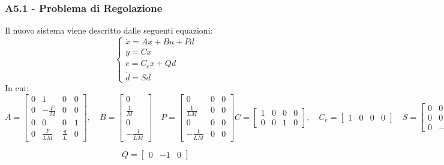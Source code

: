 \documentclass{beamer}
\begin{document}
\begin{frame}
	\frametitle{A5.1 - Problema di Regolazione}%
	Il nuovo sistema viene descritto dalle seguenti equazioni:
	\begin{equation*}
		\begin{cases}
			\dot{x}=Ax+Bu+Pd \\
			y=Cx             \\
			e=C_{e}x+Qd      \\
			\dot{d}=Sd
		\end{cases}
	\end{equation*}
	In cui:\begin{equation*}
		A=\begin{bmatrix}
			0 & 1            & 0           & 0 \\
			0 & -\frac{F}{M} & 0           & 0 \\
			0 & 0            & 0           & 1 \\
			0 & \frac{F}{LM} & \frac{g}{L} & 0
		\end{bmatrix},\quad B=\begin{bmatrix}
			0 \\\frac{1}{M}\\0\\-\frac{1}{LM}
		\end{bmatrix}\quad P=\begin{bmatrix}
			0 & 0 & 0 \\\frac{1}{LM}&0&0\\0&0&0\\-\frac{1}{LM}&0&0
		\end{bmatrix}
		C=\begin{bmatrix}
			1 & 0 & 0 & 0 \\0&0&1&0
		\end{bmatrix},\quad C_{e}=\begin{bmatrix}
			1 & 0 & 0 & 0
		\end{bmatrix}\quad S=\begin{bmatrix}
			0 & 0 & 0 \\ 0&0&\omega \\0&-\omega & 0
		\end{bmatrix}
	\end{equation*}
	\begin{center}
		\begin{equation*}
			Q=\begin{bmatrix}
				0 & -1 & 0
			\end{bmatrix}
		\end{equation*}
	\end{center}
\end{frame}
\end{document}
